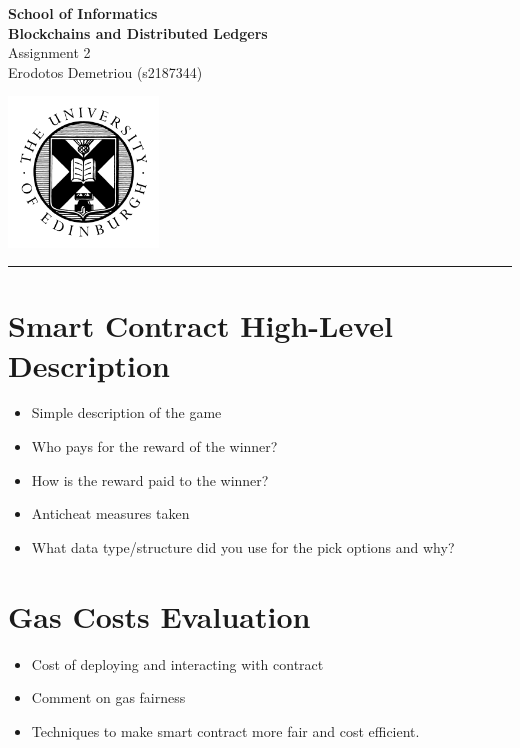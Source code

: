 \documentclass[11pt,a4paper]{article}
\begin{document}
\noindent
\begin{minipage}{120mm}
        {\huge {\bf School of Informatics}}\\
        {\Large {\bf Blockchains and Distributed Ledgers}}\\

        {\Large Assignment 2}\\
        {\normalsize Erodotos Demetriou (s2187344)}
\end{minipage}
\hfill
\begin{minipage}{40mm}              
        \includegraphics[width=40mm]{crest.png}
\end{minipage}

\begin{center}
\rule{\linewidth}{0.5mm}
\end{center}

\section*{Smart Contract High-Level Description}
\begin{itemize}
        \item Simple description of the game
        \item Who pays for the reward of the winner?
        \item How is the reward paid to the winner?
        \item Anticheat measures taken
        \item What data type/structure did you use for the pick options and why?
\end{itemize}

\section*{Gas Costs Evaluation}
\begin{itemize}
        \item Cost of deploying and interacting with contract
        \item Comment on gas fairness
        \item Techniques to make smart contract more fair and cost efficient.
\end{itemize}
\end{document}
